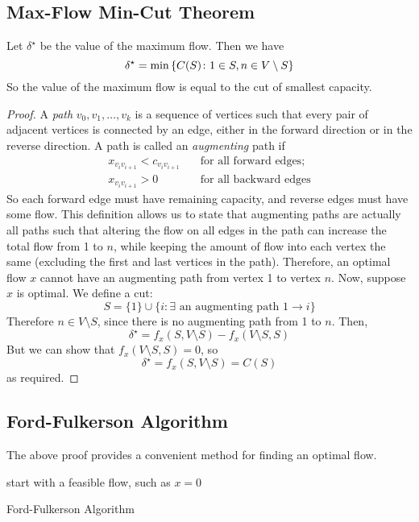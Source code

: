 \subsection{Max-Flow Min-Cut Theorem}
\begin{theorem}
	Let \( \delta^\star \) be the value of the maximum flow.
	Then we have
	\[
		\delta^\star = \min \qty{ C(S) \colon 1 \in S, n \in V \setminus S }
	\]
	So the value of the maximum flow is equal to the cut of smallest capacity.
\end{theorem}
\begin{proof}
	A \textit{path} \( v_0, v_1, \dots, v_k \) is a sequence of vertices such that every pair of adjacent vertices is connected by an edge, either in the forward direction or in the reverse direction.
	A path is called an \textit{augmenting} path if
	\begin{align*}
		x_{v_i v_{i+1}} < c_{v_i v_{i+1}} & \quad \text{for all forward edges}; \\
		x_{v_i v_{i+1}} > 0               & \quad \text{for all backward edges}
	\end{align*}
	So each forward edge must have remaining capacity, and reverse edges must have some flow.
	This definition allows us to state that augmenting paths are actually all paths such that altering the flow on all edges in the path can increase the total flow from 1 to \( n \), while keeping the amount of flow into each vertex the same (excluding the first and last vertices in the path).
	Therefore, an optimal flow \( x \) cannot have an augmenting path from vertex 1 to vertex \( n \).
	Now, suppose \( x \) is optimal.
	We define a cut:
	\[
		S = \{ 1 \} \cup \{ i \colon \exists \text{ an augmenting path } 1 \to i \}
	\]
	Therefore \( n \in V \setminus S \), since there is no augmenting path from 1 to \( n \).
	Then,
	\[
		\delta^\star = f_x(S, V \setminus S) - f_x(V \setminus S, S)
	\]
	But we can show that \( f_x(V \setminus S, S) = 0 \), so
	\[
		\delta^\star = f_x(S, V \setminus S) = C(S)
	\]
	as required.
\end{proof}

\subsection{Ford-Fulkerson Algorithm}
The above proof provides a convenient method for finding an optimal flow.

\begin{algorithm*}[H]
	\SetAlgoLined{}
	start with a feasible flow, such as \(x = 0\)\;
	\caption{Ford-Fulkerson Algorithm}
\end{algorithm*}

